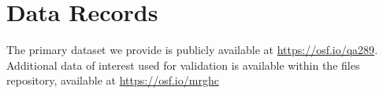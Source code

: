 \documentclass[fleqn,10pt]{wlscirep}
\begin{document}





 

\section*{Data Records}

The primary dataset we provide is publicly available at \url{https://osf.io/qa289}. Additional data of interest used for validation is available within the files repository, available at \url{https://osf.io/mrghc}

\end{document}

